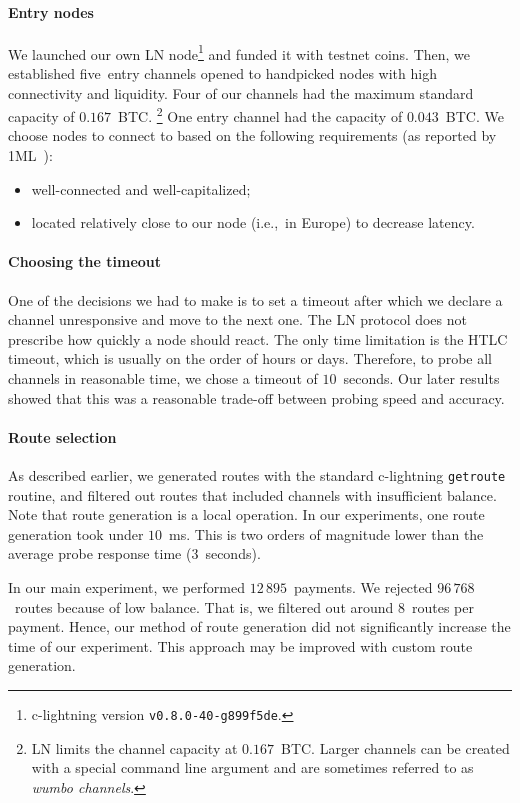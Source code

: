 \paragraph{Entry nodes}
We launched our own LN node\footnote{c-lightning version \texttt{v0.8.0-40-g899f5de}.} and funded it with testnet coins.
Then, we established five~entry channels opened to handpicked nodes with high connectivity and liquidity.
Four of our channels had the maximum standard capacity of $0.167$~BTC.
\footnote{LN limits the channel capacity at $0.167$~BTC. Larger channels can be created with a special command line argument and are sometimes referred to as \textit{wumbo channels}.}
One entry channel had the capacity of $0.043$~BTC.
We choose nodes to connect to based on the following requirements (as reported by 1ML~\cite{1MLTopConnected}):
\begin{itemize}
	\item well-connected and well-capitalized;
	\item located relatively close to our node (i.e.,~in Europe) to decrease latency.
\end{itemize}

\paragraph{Choosing the timeout}
One of the decisions we had to make is to set a timeout after which we declare a channel unresponsive and move to the next one.
The LN protocol does not prescribe how quickly a node should react.
The only time limitation is the HTLC timeout, which is usually on the order of hours or days.
Therefore, to probe all channels in reasonable time, we chose a timeout of $10$~seconds.
Our later results showed that this was a reasonable trade-off between probing speed and accuracy.

\paragraph{Route selection}
As described earlier, we generated routes with the standard c-lightning \texttt{getroute} routine, and filtered out routes that included channels with insufficient balance.
Note that route generation is a local operation.
In our experiments, one route generation took under $10$~ms.
This is two orders of magnitude lower than the average probe response time ($3$~seconds).

In our main experiment, we performed $12\,895$~payments.
We rejected $96\,768$~routes because of low balance.
That is, we filtered out around $8$~routes per payment.
Hence, our method of route generation did not significantly increase the time of our experiment.
This approach may be improved with custom route generation.

